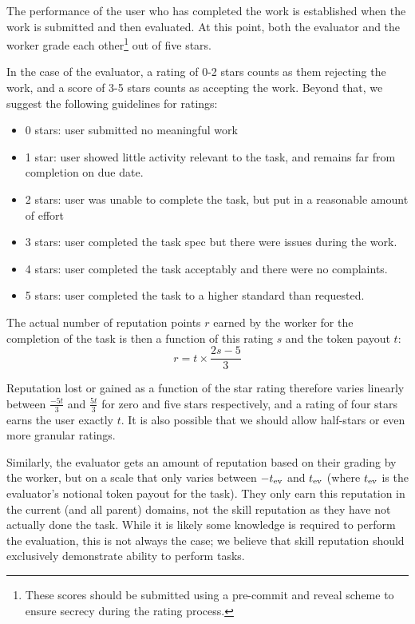 The performance of the user who has completed the work is established when the work is submitted and then evaluated. At this point, both the evaluator and the worker grade each other\footnote{These scores should be submitted using a pre-commit and reveal scheme to ensure secrecy during the rating process.} out of five stars.

In the case of the evaluator, a rating of 0-2 stars counts as them rejecting the work, and a score of 3-5 stars counts as accepting the work. Beyond that, we suggest the following guidelines for ratings:
\begin{itemize}
 \item[] 0 stars: user submitted no meaningful work 
 \item[]1 star:\phantom{s} user showed little activity relevant to the task, and remains far from completion on due date.
 \item[]2 stars: user was unable to complete the task, but put in a reasonable amount of effort
 \item[]3 stars: user completed the task spec but there were issues during the work.
 \item[]4 stars: user completed the task acceptably and there were no complaints.
 \item[]5 stars: user completed the task to a higher standard than requested.
\end{itemize}

The actual number of reputation points $r$ earned by the worker for the completion of the task is then a function of this rating $s$ and the token payout $t$:
\begin{equation}\label{eq:stars-to-rep}
 r = t \times \frac{2s - 5}{3} 
\end{equation}
 
Reputation lost or gained as a function of the star rating therefore varies linearly between $\frac{-5t}{3}$ and $\frac{5t}{3}$ for zero and five stars respectively, and a rating of four stars earns the user exactly $t$. It is also possible that we should allow half-stars or even more granular ratings.

Similarly, the evaluator gets an amount of reputation based on their grading by the worker, but on a scale that only varies between $-t_{\rm ev}$ and $t_{\rm ev}$ (where $t_{\rm ev}$ is the evaluator's notional token payout for the task). They only earn this reputation in the current (and all parent) domains, not the skill reputation as they have not actually done the task. While it is likely some knowledge is required to perform the evaluation, this is not always the case; we believe that skill reputation should exclusively demonstrate ability to perform tasks.

